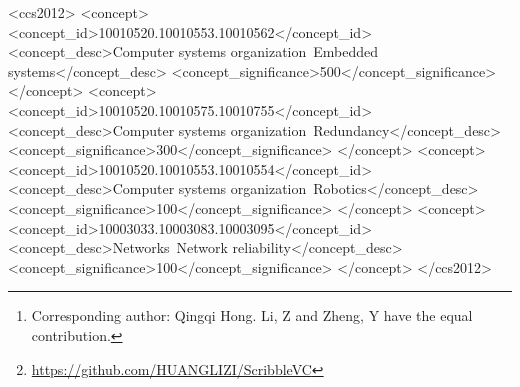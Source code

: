 \documentclass[sigconf,natbib=false]{acmart}
\newcommand\blfootnote[1]{\begingroup
  \renewcommand\thefootnote{}\footnote{#1}\addtocounter{footnote}{-1}\endgroup
}
\begin{document}
\begin{abstract}
  Medical image segmentation plays a critical role in clinical decision-making, treatment planning, and disease monitoring. However, accurate segmentation of medical images is challenging due to several factors, such as the lack of high-quality annotation, imaging noise, and anatomical differences across patients. In addition, there is still a considerable gap in performance between the existing label-efficient methods and fully-supervised methods. To address the above challenges, we propose ScribbleVC, a novel framework for scribble-supervised medical image segmentation that leverages vision and class embeddings via the multimodal information enhancement mechanism. In addition, ScribbleVC uniformly utilizes the CNN features and Transformer features to achieve better visual feature extraction. The proposed method combines a scribble-based approach with a segmentation network and a class-embedding module to produce accurate segmentation masks. We evaluate ScribbleVC on three benchmark datasets and compare it with state-of-the-art methods. The experimental results demonstrate that our method outperforms existing approaches in terms of accuracy, robustness, and efficiency. The datasets and code are released on GitHub.\blfootnote{Corresponding author: Qingqi Hong. Li, Z and Zheng, Y have the equal contribution.}\footnote{\href{https://github.com/HUANGLIZI/ScribbleVC}{https://github.com/HUANGLIZI/ScribbleVC}}
\end{abstract}

\begin{CCSXML}
<ccs2012>
 <concept>
  <concept_id>10010520.10010553.10010562</concept_id>
  <concept_desc>Computer systems organization~Embedded systems</concept_desc>
  <concept_significance>500</concept_significance>
 </concept>
 <concept>
  <concept_id>10010520.10010575.10010755</concept_id>
  <concept_desc>Computer systems organization~Redundancy</concept_desc>
  <concept_significance>300</concept_significance>
 </concept>
 <concept>
  <concept_id>10010520.10010553.10010554</concept_id>
  <concept_desc>Computer systems organization~Robotics</concept_desc>
  <concept_significance>100</concept_significance>
 </concept>
 <concept>
  <concept_id>10003033.10003083.10003095</concept_id>
  <concept_desc>Networks~Network reliability</concept_desc>
  <concept_significance>100</concept_significance>
 </concept>
</ccs2012>
\end{CCSXML}

\end{document}
